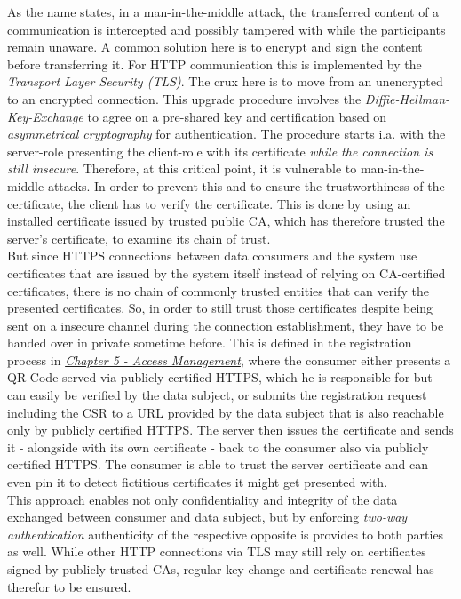 \documentclass[12pt,english,a4paper,titlepage,cleardoublepage=empty,dottedtoc]{report}
\begin{document}
As the name states, in a man-in-the-middle attack, the transferred
content of a communication is intercepted and possibly tampered with
while the participants remain unaware. A common solution here is to
encrypt and sign the content before transferring it. For HTTP
communication this is implemented by the \emph{Transport Layer Security
(TLS)}. The crux here is to move from an unencrypted to an encrypted
connection. This upgrade procedure involves the
\emph{Diffie-Hellman-Key-Exchange} to agree on a pre-shared key and
certification based on \emph{asymmetrical cryptography} for
authentication. The procedure starts i.a. with the server-role
presenting the client-role with its certificate \emph{while the
connection is still insecure}. Therefore, at this critical point, it is
vulnerable to man-in-the-middle attacks. In order to prevent this and to
ensure the trustworthiness of the certificate, the client has to verify
the certificate. This is done by using an installed certificate issued
by trusted public CA, which has therefore trusted the server's
certificate, to examine its chain of trust.\\
But since HTTPS connections between data consumers and the system use
certificates that are issued by the system itself instead of relying on
CA-certified certificates, there is no chain of commonly trusted
entities that can verify the presented certificates. So, in order to
still trust those certificates despite being sent on a insecure channel
during the connection establishment, they have to be handed over in
private sometime before. This is defined in the registration process in
\emph{\protect\hyperlink{access-management}{Chapter 5 - Access
Management}}, where the consumer either presents a QR-Code served via
publicly certified HTTPS, which he is responsible for but can easily be
verified by the data subject, or submits the registration request
including the CSR to a URL provided by the data subject that is also
reachable only by publicly certified HTTPS. The server then issues the
certificate and sends it - alongside with its own certificate - back to
the consumer also via publicly certified HTTPS. The consumer is able to
trust the server certificate and can even pin it to detect fictitious
certificates it might get presented with.\\
This approach enables not only confidentiality and integrity of the data
exchanged between consumer and data subject, but by enforcing
\emph{two-way authentication} authenticity of the respective opposite is
provides to both parties as well. While other HTTP connections via TLS
may still rely on certificates signed by publicly trusted CAs, regular
key change and certificate renewal has therefor to be ensured.
\end{document}
